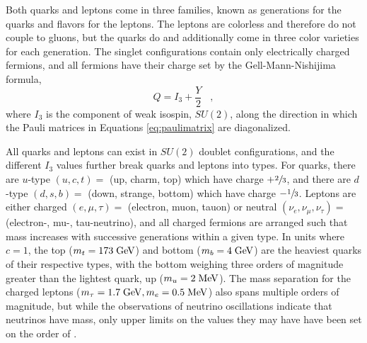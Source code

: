  Both quarks and leptons come in three
  families, known as generations for the 
  quarks and flavors for the leptons.
 The leptons are colorless and therefore
  do not couple to gluons, but the 
  quarks do and additionally 
  come in three color varieties
  for each generation. %
 The singlet configurations contain only electrically charged
  fermions, and all fermions have their charge set
  by the Gell-Mann-Nishijima formula,
\begin{equation} \label{eq:gmnformula}
 Q=I_3+\frac{Y}{2}\;\;\;,
\end{equation}
  where $I_3$ is the component of weak isospin, $SU(2)$,
  along the direction in which the 
  Pauli matrices in Equations \ref{eq:paulimatrix} are 
  diagonalized.


 All quarks and leptons can exist in $SU(2)$
  doublet configurations, and the different $I_3$ 
  values further break quarks and leptons into types.
 For quarks, there are $u$-type {$(u,c,t)=$ (up, charm, top)} which have charge $+\sfrac{2}{3}$,
  and there are $d$-type {$(d,s,b)=$ (down, strange, bottom)} which have charge $-\sfrac{1}{3}$.
 Leptons are either charged {$(e,\mu,\tau)=$ (electron, muon, tauon)}
  or neutral {$(\nu_e,\nu_\mu,\nu_\tau)=$ (electron-, mu-, tau-neutrino)},
  and all charged fermions are arranged such that mass
  increases with successive generations within a given type. 
 In units where $c=1$, the top ($m_t=173 \;\mathrm{GeV}$)
  and bottom ($m_b=4 \;\mathrm{GeV}$) are the heaviest quarks
  of their respective types, with the bottom 
  weighing three orders of magnitude greater than 
  the lightest quark, up ($m_u=2 \;\mathrm{MeV}$).
 The mass separation for the charged leptons
  ($m_\tau=1.7 \;\mathrm{GeV}, m_e=0.5 \;\mathrm{MeV}$)
  also spans multiple orders of magnitude,
  but while the observations of neutrino oscillations
  indicate that neutrinos have mass, 
  only upper limits on the values they may have
  have been set on the order of \MeV. 

